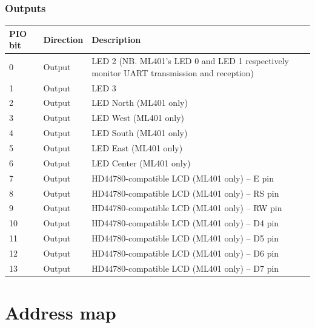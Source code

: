 \documentclass[a4paper,11pt]{article}
\begin{document}
\subsubsection{Outputs}

\begin{tabularx}{\textwidth}{|l|l|X|}
\hline
\bf{PIO bit} & \bf{Direction} & \bf{Description} \\
\hline
0 & Output & LED 2 (NB. ML401's LED 0 and LED 1 respectively monitor UART transmission and reception) \\
\hline
1 & Output & LED 3 \\
\hline
2 & Output & LED North (ML401 only) \\
\hline
3 & Output & LED West (ML401 only) \\
\hline
4 & Output & LED South (ML401 only) \\
\hline
5 & Output & LED East (ML401 only) \\
\hline
6 & Output & LED Center (ML401 only) \\
\hline
7 & Output & HD44780-compatible LCD (ML401 only) -- E pin \\
\hline
8 & Output & HD44780-compatible LCD (ML401 only) -- RS pin \\
\hline
9 & Output & HD44780-compatible LCD (ML401 only) -- RW pin \\
\hline
10 & Output & HD44780-compatible LCD (ML401 only) -- D4 pin \\
\hline
11 & Output & HD44780-compatible LCD (ML401 only) -- D5 pin \\
\hline
12 & Output & HD44780-compatible LCD (ML401 only) -- D6 pin \\
\hline
13 & Output & HD44780-compatible LCD (ML401 only) -- D7 pin \\
\hline
\end{tabularx}

\section{Address map}
\end{document}
